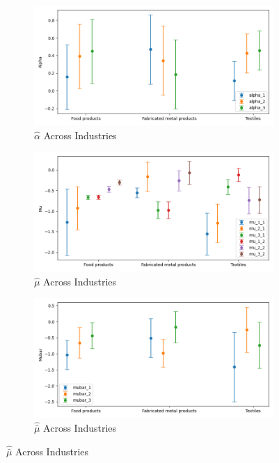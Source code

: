 \documentclass{article}
\begin{document}
\begin{figure}[ht!]
    \centering 
    \caption{Stationary Mixture Model with $\log K$, Import and CIIU Across Industries}
    \begin{subfigure}[t]{0.32\textwidth}
        \centering
        \includegraphics[width=\textwidth]{figure/stationary_mixture_kmshare_ciiu_alpha_across_industries_m3.png}
        \caption{$\hat\alpha$ Across Industries}
    \end{subfigure}
    \begin{subfigure}[t]{0.32\textwidth}
        \centering
        \includegraphics[width=\textwidth]{figure/stationary_mixture_kmshare_ciiu_mu_across_industries_m3.png}
        \caption{$\hat\mu$ Across Industries}
    \end{subfigure}
    \begin{subfigure}[t]{0.32\textwidth}
        \centering
        \includegraphics[width=\textwidth]{figure/stationary_mixture_kmshare_ciiu_mubar_across_industries_m3.png}
        \caption{$\hat{\bar\mu}$ Across Industries}
    \end{subfigure}


\end{figure}
\end{document}
